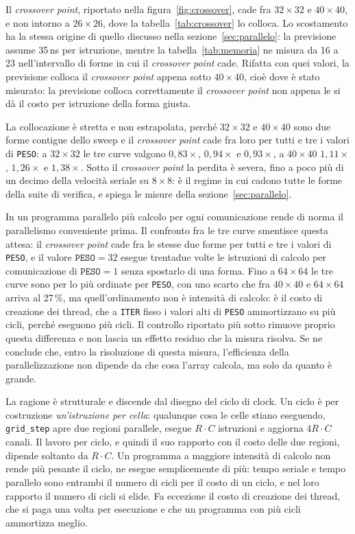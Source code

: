 Il \emph{crossover point}, riportato nella figura~\ref{fig:crossover}, cade fra $32\times32$ e
$40\times40$, e non intorno a $26\times26$, dove la
tabella~\ref{tab:crossover} lo colloca. Lo scostamento
ha la stessa origine di quello discusso nella sezione~\ref{sec:parallelo}: la
previsione assume 35\,ns per istruzione, mentre la tabella~\ref{tab:memoria}
ne misura da 16 a 23 nell'intervallo di forme in cui il \emph{crossover point} cade. Rifatta
con quei valori, la previsione colloca il \emph{crossover point} appena sotto $40\times40$,
cioè dove è stato misurato: la previsione colloca correttamente il \emph{crossover point}
non appena le si dà il costo per istruzione della forma giusta.


La collocazione è stretta e non estrapolata, perché $32\times32$ e
$40\times40$ sono due forme contigue dello sweep e il \emph{crossover point} cade fra loro per
tutti e tre i valori di \texttt{PESO}: a $32\times32$ le tre curve valgono
$0{,}83\times$, $0{,}94\times$ e $0{,}93\times$, a $40\times40$ $1{,}11\times$,
$1{,}26\times$ e $1{,}38\times$. Sotto il \emph{crossover point} la perdita è severa, fino a
poco più di un decimo della velocità seriale su $8\times8$: è il regime in cui
cadono tutte le forme della suite di verifica, e spiega le misure della
sezione~\ref{sec:parallelo}.

In un programma parallelo più calcolo per ogni comunicazione rende di norma il
parallelismo conveniente prima. Il confronto fra le tre curve smentisce questa
attesa: il \emph{crossover point} cade fra le stesse due forme per tutti e tre i valori di
\texttt{PESO}, e il valore $\texttt{PESO}=32$ esegue trentadue volte le
istruzioni di calcolo per comunicazione di $\texttt{PESO}=1$ senza spostarlo di
una forma. Fino a $64\times64$ le tre curve sono per lo più ordinate per
\texttt{PESO}, con uno scarto che fra $40\times40$ e $64\times64$ arriva al
27\,\%, ma quell'ordinamento non è intensità di calcolo: è il costo di creazione
dei thread, che a \texttt{ITER} fisso i valori alti di \texttt{PESO} ammortizzano
su più cicli, perché eseguono più cicli. Il controllo riportato più sotto rimuove
proprio questa differenza e non lascia un effetto residuo che la misura risolva. Se ne conclude che,
entro la risoluzione di questa misura, l'efficienza della parallelizzazione non dipende da che cosa l'array calcola,
ma solo da quanto è grande.

La ragione è strutturale e discende dal disegno del ciclo di clock. Un ciclo è
per costruzione \emph{un'istruzione per cella}: qualunque cosa le celle stiano
eseguendo, \texttt{grid\_step} apre due regioni parallele, esegue $R \cdot C$
istruzioni e aggiorna $4 R \cdot C$ canali. Il lavoro per ciclo, e quindi il suo
rapporto con il costo delle due regioni, dipende soltanto da $R \cdot C$. Un
programma a maggiore intensità di calcolo non rende più pesante il ciclo, ne
esegue semplicemente di più: tempo seriale e tempo parallelo sono entrambi il
numero di cicli per il costo di un ciclo, e nel loro rapporto il numero di cicli
si elide. Fa eccezione il costo di creazione dei thread, che si paga una volta
per esecuzione e che un programma con più cicli ammortizza meglio.

